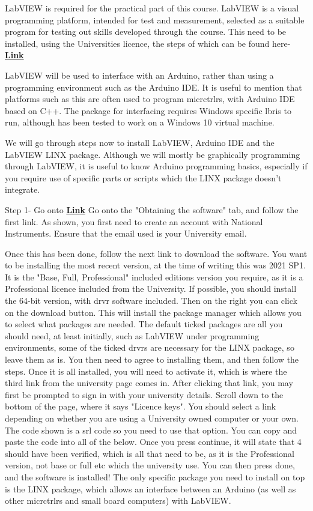 \documentclass[a4paper,11pt]{report}
\let\oldhref\href %
\renewcommand{\href}[2]{\oldhref{#1}{\bfseries#2}}
\begin{document}
LabVIEW is required for the practical part of this course. LabVIEW is a visual programming platform, intended for test and measurement, selected as a suitable program for testing out skills developed through the course. This need to be installed, using the Universities licence, the steps of which can be found here- \href{https://www.york.ac.uk/it-services/software/a-z/labview/}{Link}

LabVIEW will be used to interface with an Arduino, rather than using a programming environment such as the Arduino IDE. It is useful to mention that platforms such as this are often used to program \gls{micrctrlr}s, with Arduino IDE based on C++. The package for interfacing requires Windows specific \gls{lbris} to run, although has been tested to work on a Windows 10 virtual machine.

We will go through steps now to install LabVIEW, Arduino IDE and the LabVIEW LINX package. Although we will mostly be graphically programming through LabVIEW, it is useful to know Arduino programming basics, especially if you require use of specific parts or scripts which the LINX package doesn't integrate.

Step 1- Go onto \href{https://www.york.ac.uk/it-services/software/a-z/labview/}{Link}
Go onto the "Obtaining the software" tab, and follow the first link. As shown, you first need to create an account with National Instruments. Ensure that the email used is your University email.

Once this has been done, follow the next link to download the software. You want to be installing the most recent version, at the time of writing this was 2021 SP1. It is the "Base, Full, Professional" included editions version you require, as it is a Professional licence included from the University. If possible, you should install the 64-bit version, with \gls{drvr} software included. Then on the right you can click on the download button. This will install the package manager which allows you to select what packages are needed. The default ticked packages are all you should need, at least initially, such as LabVIEW under programming environments, some of the ticked \gls{drvr}s are necessary for the LINX package, so leave them as is. You then need to agree to installing them, and then follow the steps. Once it is all installed, you will need to activate it, which is where the third link from the university page comes in. After clicking that link, you may first be prompted to sign in with your university details. Scroll down to the bottom of the page, where it says "Licence keys". You should select a link depending on whether you are using a University owned computer or your own. The code shown is a \gls{srl} code so you need to use that option. You can copy and paste the code into all of the below. Once you press continue, it will state that 4 should have been verified, which is all that need to be, as it is the Professional version, not base or full etc which the university use. You can then press done, and the software is installed! The only specific package you need to install on top is the LINX package, which allows an interface between an Arduino (as well as other \gls{micrctrlr}s and small board computers) with LabVIEW.
\end{document}
